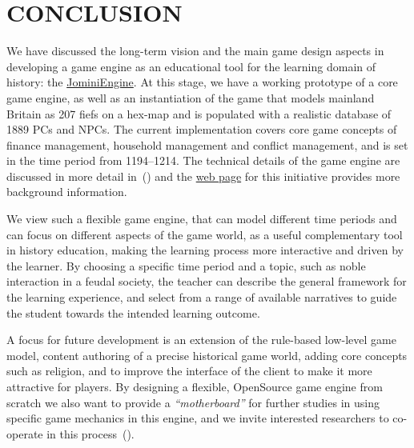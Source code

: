 \documentclass[11pt]{article}
\newcommand{\hwlcomment}[1]{$\spadesuit$\textsc{#1}$\spadesuit$}
\renewcommand{\hwlcomment}[1]{}
\begin{document}
\hwlcomment{need to add more on game narrative and immersive player experience here}


\section*{CONCLUSION}

We have discussed the long-term vision and the main game design aspects in
developing a game engine as an educational tool for the learning domain of history: the \href{http://www.macs.hw.ac.uk/~hwloidl/Projects/JominiEngine/}{JominiEngine}. %
At this stage, we have a working prototype of a core game engine, as well as an instantiation of the game
that models mainland Britain as 207 fiefs on a hex-map and is populated
with a realistic database of 1889 PCs and NPCs. The current implementation covers
core game concepts of finance management, household management and conflict management, and
is set in the time period from 1194--1214.
The technical details of the game engine are discussed in more detail
in~(\cite{GALA15}) and the \href{http://www.macs.hw.ac.uk/~hwloidl/Projects/JominiEngine/}{web page} for this initiative provides more background information. %

We view such a flexible game engine, that can model different time periods and can focus on different
aspects of the game world, as a useful complementary tool in history education, making the
learning process more interactive and driven by the learner. By choosing a specific time period
and a  topic, such as noble interaction in a feudal society, the teacher
can describe the general framework for the learning experience, and select from
a range of available narratives to guide the student towards the intended learning outcome.

\hwlcomment{Comment on current size of server, size of DB, and security enhancements}

A focus for future development is an extension of the rule-based low-level game model,
content authoring of a precise historical game world, adding core concepts such as religion, and to
improve the interface of the client to make it more attractive for players.
%
By designing a flexible, OpenSource game engine from scratch we also want to provide a
\emph{``motherboard''} for further studies in using specific game mechanics in this engine,
and we invite interested researchers to co-operate in this process~(\cite{JominiEngineURL}).
\end{document}
